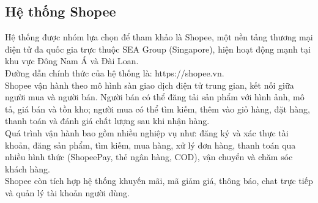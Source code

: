 \subsection{Hệ thống Shopee}
Hệ thống được nhóm lựa chọn để tham khảo là Shopee, một nền tảng thương mại điện tử đa quốc gia trực thuộc SEA Group (Singapore), hiện hoạt động mạnh tại khu vực Đông Nam Á và Đài Loan.
\\ Đường dẫn chính thức của hệ thống là: https://shopee.vn.
\\ Shopee vận hành theo mô hình sàn giao dịch điện tử trung gian, kết nối giữa người mua và người bán. Người bán có thể đăng tải sản phẩm với hình ảnh, mô tả, giá bán và tồn kho; người mua có thể tìm kiếm, thêm vào giỏ hàng, đặt hàng, thanh toán và đánh giá chất lượng sau khi nhận hàng.
\\ Quá trình vận hành bao gồm nhiều nghiệp vụ như: đăng ký và xác thực tài khoản, đăng sản phẩm, tìm kiếm, mua hàng, xử lý đơn hàng, thanh toán qua nhiều hình thức (ShopeePay, thẻ ngân hàng, COD), vận chuyển và chăm sóc khách hàng.
\\  Shopee còn tích hợp hệ thống khuyến mãi, mã giảm giá, thông báo, chat trực tiếp và quản lý tài khoản người dùng.
